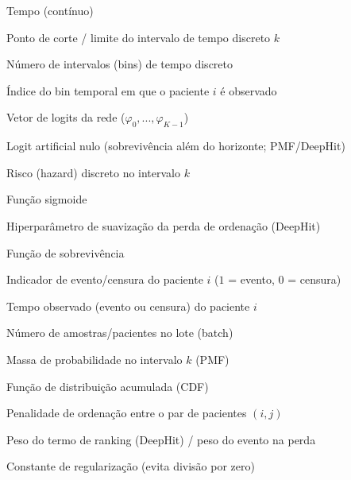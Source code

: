 \begin{simbolos}

	\item[$ t $] Tempo (contínuo)
	\item[$ t_k, c_k $] Ponto de corte / limite do intervalo de tempo discreto $k$
	\item[$ K $] Número de intervalos (bins) de tempo discreto
	\item[$ k_i $] Índice do bin temporal em que o paciente $i$ é observado
	\item[$ \varphi $] Vetor de logits da rede ($\varphi_0,...,\varphi_{K-1}$)
	\item[$ \varphi_K $] Logit artificial nulo (sobrevivência além do horizonte; PMF/DeepHit)
	\item[$ h_k $] Risco (hazard) discreto no intervalo $k$
	\item[$ \sigma(\cdot) $] Função sigmoide
	\item[$ \sigma_{DH} $] Hiperparâmetro de suavização da perda de ordenação (DeepHit)
	\item[$ S(t\,|\,x) $] Função de sobrevivência
	\item[$ d_i $] Indicador de evento/censura do paciente $i$ ($1$ = evento, $0$ = censura)
	\item[$ t_i $] Tempo observado (evento ou censura) do paciente $i$
	\item[$ N $] Número de amostras/pacientes no lote (batch)
	\item[$ p_k $] Massa de probabilidade no intervalo $k$ (PMF)
	\item[$ F(t_k\,|\,x) $] Função de distribuição acumulada (CDF)
	\item[$ \eta(i,j) $] Penalidade de ordenação entre o par de pacientes $(i,j)$
	\item[$ \alpha $] Peso do termo de ranking (DeepHit) / peso do evento na perda
	\item[$ \varepsilon $] Constante de regularização (evita divisão por zero)


\end{simbolos}
